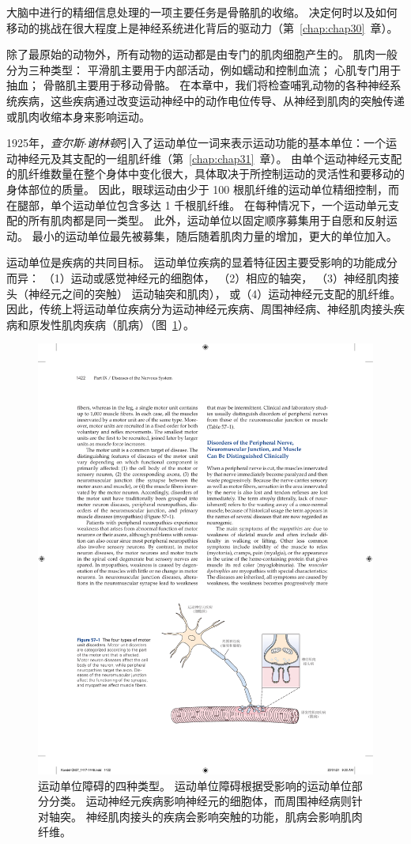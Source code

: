 大脑中进行的精细信息处理的一项主要任务是骨骼肌的收缩。
决定何时以及如何移动的挑战在很大程度上是神经系统进化背后的驱动力（第~\ref{chap:chap30}~章）。


除了最原始的动物外，所有动物的运动都是由专门的肌肉细胞产生的。
肌肉一般分为三种类型：
平滑肌主要用于内部活动，例如蠕动和控制血流；
心肌专门用于抽血；
骨骼肌主要用于移动骨骼。
在本章中，我们将检查哺乳动物的各种神经系统疾病，这些疾病通过改变运动神经中的动作电位传导、从神经到肌肉的突触传递或肌肉收缩本身来影响运动。


1925年，\textit{查尔斯$\cdot$谢林顿}引入了运动单位一词来表示运动功能的基本单位：一个运动神经元及其支配的一组肌纤维（第~\ref{chap:chap31}~章）。
由单个运动神经元支配的肌纤维数量在整个身体中变化很大，具体取决于所控制运动的灵活性和要移动的身体部位的质量。
因此，眼球运动由少于 100 根肌纤维的运动单位精细控制，而在腿部，单个运动单位包含多达 1 千根肌纤维。
在每种情况下，一个运动单元支配的所有肌肉都是同一类型。
此外，运动单位以固定顺序募集用于自愿和反射运动。
最小的运动单位最先被募集，随后随着肌肉力量的增加，更大的单位加入。


运动单位是疾病的共同目标。
运动单位疾病的显着特征因主要受影响的功能成分而异：
（1）运动或感觉神经元的细胞体，
（2）相应的轴突，
（3）神经肌肉接头（神经元之间的突触） 运动轴突和肌肉），
或（4）运动神经元支配的肌纤维。
因此，传统上将运动单位疾病分为运动神经元疾病、周围神经病、神经肌肉接头疾病和原发性肌肉疾病（肌病）（图~\ref{fig:57_1}）。


\begin{figure}[htbp]
	\centering
	\includegraphics[width=0.9\linewidth]{chap57/fig_57_1}
	\caption{运动单位障碍的四种类型。
		运动单位障碍根据受影响的运动单位部分分类。
		运动神经元疾病影响神经元的细胞体，而周围神经病则针对轴突。
		神经肌肉接头的疾病会影响突触的功能，肌病会影响肌肉纤维。}
	\label{fig:57_1}
\end{figure}


